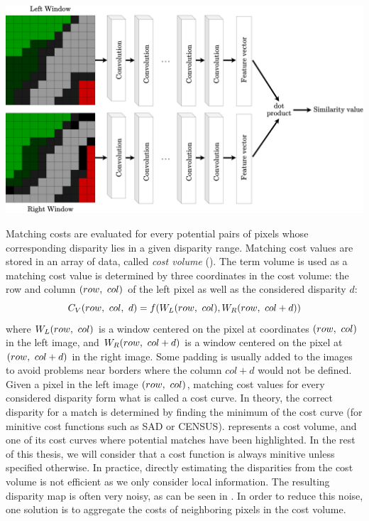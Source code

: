 \begin{example}
	{\centering\includegraphics[width=0.8\linewidth]{Images/Chap_1/MCCNN.png}\label{fig:mccnn}}
\end{example}

Matching costs are evaluated for every potential pairs of pixels whose corresponding disparity lies in a given disparity range. Matching cost values are stored in an array of data, called \textit{cost volume} (). The term volume is used as a matching cost value is determined by three coordinates in the cost volume: the row and column $(row, ~col)$ of the left pixel as well as the considered disparity $d$:
\begin{equation}\label{eq:cost_volume}
    C_V(row, ~col, ~d) = f(W_L(row, ~col),  W_R(row, ~col+d))
\end{equation}
where $W_L(row, ~col)$ is a window centered on the pixel at coordinates $(row, ~col)$ in the left image, and $W_R(row, ~col+d)$ is a window centered on the pixel at $(row, ~col+d)$ in the right image. Some padding is usually added to the images to avoid problems near borders where the column $col+d$ would not be defined. Given a pixel in the left image $(row, ~col)$, matching cost values for every considered disparity form what is called a cost curve. In theory, the correct disparity for a match is determined by finding the minimum of the cost curve (for minitive cost functions such as SAD or CENSUS).  represents a cost volume, and one of its cost curves where potential matches have been highlighted. In the rest of this thesis, we will consider that a cost function is always minitive unless specified otherwise. In practice, directly estimating the disparities from the cost volume is not efficient as we only consider local information. The resulting disparity map is often very noisy, as can be seen in . In order to reduce this noise, one solution is to aggregate the costs of neighboring pixels in the cost volume.

